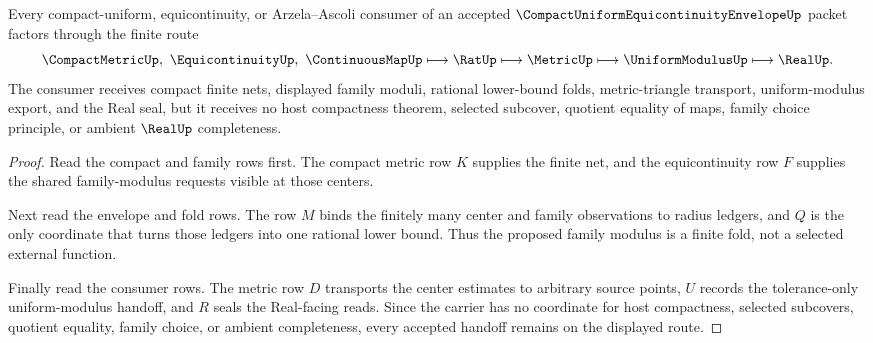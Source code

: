 \begin{theorem}
\label{thm:compact-uniform-equicontinuity-envelope-family-modulus-handoff}
Every compact-uniform, equicontinuity, or Arzela--Ascoli consumer of an accepted $\CompactUniformEquicontinuityEnvelopeUp$ packet factors through the finite route
$$
\CompactMetricUp,\ \EquicontinuityUp,\ \ContinuousMapUp \longmapsto
\RatUp \longmapsto
\MetricUp \longmapsto
\UniformModulusUp \longmapsto
\RealUp .
$$
The consumer receives compact finite nets, displayed family moduli, rational lower-bound folds, metric-triangle transport, uniform-modulus export, and the Real seal, but it receives no host compactness theorem, selected subcover, quotient equality of maps, family choice principle, or ambient $\RealUp$ completeness.
\end{theorem}
\begin{proof}
Read the compact and family rows first. The compact metric row $K$ supplies the finite net, and the equicontinuity row $F$ supplies the shared family-modulus requests visible at those centers.

Next read the envelope and fold rows. The row $M$ binds the finitely many center and family observations to radius ledgers, and $Q$ is the only coordinate that turns those ledgers into one rational lower bound. Thus the proposed family modulus is a finite fold, not a selected external function.

Finally read the consumer rows. The metric row $D$ transports the center estimates to arbitrary source points, $U$ records the tolerance-only uniform-modulus handoff, and $R$ seals the Real-facing reads. Since the carrier has no coordinate for host compactness, selected subcovers, quotient equality, family choice, or ambient completeness, every accepted handoff remains on the displayed route.
\end{proof}


